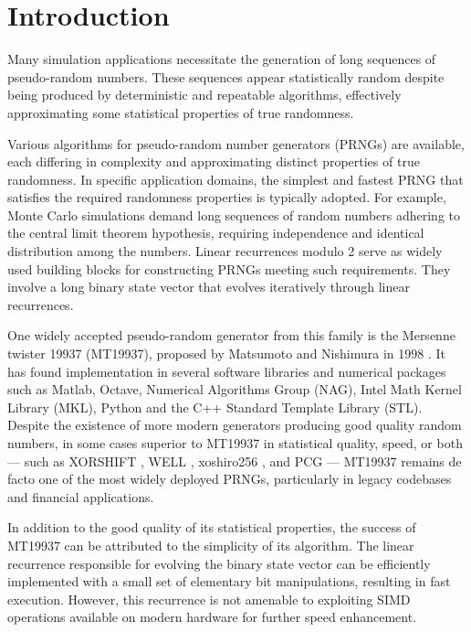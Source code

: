 \documentclass[preprint,1p,times]{elsarticle}
\begin{document}
\section{Introduction}
\label{sec:introduction}
Many simulation applications necessitate the generation of long sequences of pseudo-random numbers. These sequences appear statistically random despite being produced by deterministic and repeatable algorithms, effectively approximating some statistical properties of true randomness.

Various algorithms for pseudo-random number generators (PRNGs) are available, each differing in complexity and approximating distinct properties of true randomness. In specific application domains, the simplest and fastest PRNG that satisfies the required randomness properties is typically adopted. For example, Monte Carlo simulations demand long sequences of random numbers adhering to the central limit theorem hypothesis, requiring independence and identical distribution among the numbers. Linear recurrences modulo 2 serve as widely used building blocks for constructing PRNGs meeting such requirements. They involve a long binary state vector that evolves iteratively through linear recurrences.

One widely accepted pseudo-random generator from this family is the Mersenne twister 19937 (MT19937), proposed by Matsumoto and Nishimura in 1998 \cite{mt19937}. It has found implementation in several software libraries and numerical packages such as Matlab, Octave, Numerical Algorithms Group (NAG), Intel Math Kernel Library (MKL), Python and the C++ Standard Template Library (STL). Despite the existence of more modern generators producing good quality random numbers, in some cases superior to MT19937 in statistical quality, speed, or both --- such as XORSHIFT \cite{xorshift}, WELL \cite{well}, xoshiro256 \cite{xoshiro}, and PCG \cite{pcg} --- MT19937 remains de facto one of the most widely deployed PRNGs, particularly in legacy codebases and financial applications.

In addition to the good quality of its statistical properties, the success of MT19937 can be attributed to the simplicity of its algorithm. The linear recurrence responsible for evolving the binary state vector can be efficiently implemented with a small set of elementary bit manipulations, resulting in fast execution. However, this recurrence is not amenable to exploiting SIMD operations available on modern hardware for further speed enhancement.
\end{document}
